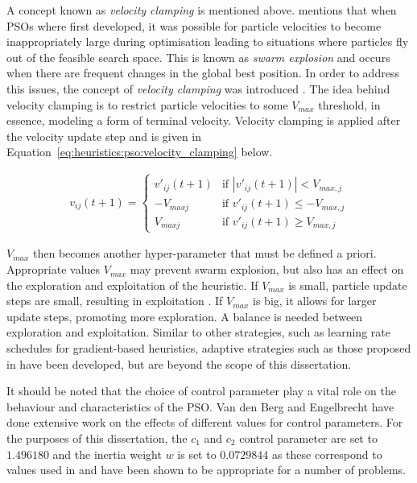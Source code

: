 A concept known as \textit{velocity clamping} is mentioned above. \citeauthor{ref:vanwyk:2014}\cite{ref:vanwyk:2014} mentions that when \acp{PSO} where first developed, it was possible for particle velocities to become inappropriately large during optimisation leading to situations where particles fly out of the feasible search space. This is known as \textit{swarm explosion} and occurs when there are frequent changes in the global best position. In order to address this issues, the concept of \textit{velocity clamping} was introduced \cite{ref:eberhart:1996}. The idea behind velocity clamping is to restrict particle velocities to some $V_{max}$ threshold, in essence, modeling a form of terminal velocity. Velocity clamping is applied after the velocity update step and is given in Equation~\ref{eq:heuristics:pso:velocity_clamping} below.

\begin{equation}
      \label{eq:heuristics:pso:velocity_clamping}
      \begin{split}
            v_{ij}(t+1)=
            \begin{cases}
                  v'_{ij}(t+1) & \text{if } |v'_{ij}(t+1)| < V_{max,j}   \\
                  -V_{maxj}    & \text{if } v'_{ij}(t+1) \leq -V_{max,j} \\
                  V_{maxj}     & \text{if } v'_{ij}(t+1) \geq V_{max,j}
            \end{cases}
      \end{split}
\end{equation}

$V_{max}$ then becomes another hyper-parameter that must be defined a priori. Appropriate values $V_{max}$ may prevent swarm explosion, but also has an effect on the exploration and exploitation of the heuristic. If $V_{max}$ is small, particle update steps are small, resulting in exploitation \cite{ref:eberhart:1996}. If $V_{max}$ is big, it allows for larger update steps, promoting more exploration. A balance is needed between exploration and exploitation. Similar to other strategies, such as learning rate schedules for gradient-based heuristics, adaptive strategies such as those proposed in \cite{ref:fan:2002} have been developed, but are beyond the scope of this dissertation.

It should be noted that the choice of control parameter play a vital role on the behaviour and characteristics of the \ac{PSO}. Van den Berg and Engelbrecht \cite{ref:vandenberg:2007}\cite{ref:vandenberg:2006} have done extensive work on the effects of different values for control parameters. For the purposes of this dissertation, the $c_{1}$ and $c_{2}$ control parameter are set to $1.496180$ and the inertia weight $w$ is set to $0.0729844$ as these correspond to values used in \cite{ref:eberhart:2000} and have been shown to be appropriate for a number of problems.

